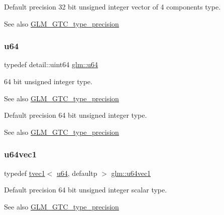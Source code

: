 Default precision 32 bit unsigned integer vector of 4 components type. \begin{DoxySeeAlso}{See also}
\hyperlink{group__gtc__type__precision}{G\+L\+M\+\_\+\+G\+T\+C\+\_\+type\+\_\+precision} 
\end{DoxySeeAlso}
\mbox{\label{group__gtc__type__precision_ga71cedd4972f9cb1a5e14dfe5ab83ecd7}} 
\subsubsection{\texorpdfstring{u64}{u64}}
{\footnotesize\ttfamily typedef detail\+::uint64 \hyperlink{group__gtc__type__precision_ga71cedd4972f9cb1a5e14dfe5ab83ecd7}{glm\+::u64}}

64 bit unsigned integer type. \begin{DoxySeeAlso}{See also}
\hyperlink{group__gtc__type__precision}{G\+L\+M\+\_\+\+G\+T\+C\+\_\+type\+\_\+precision}
\end{DoxySeeAlso}
Default precision 64 bit unsigned integer type. \begin{DoxySeeAlso}{See also}
\hyperlink{group__gtc__type__precision}{G\+L\+M\+\_\+\+G\+T\+C\+\_\+type\+\_\+precision} 
\end{DoxySeeAlso}
\mbox{\label{group__gtc__type__precision_gaf0a59fdb715cf4ddf0c4dabf0e2286a9}} 
\subsubsection{\texorpdfstring{u64vec1}{u64vec1}}
{\footnotesize\ttfamily typedef \hyperlink{structglm_1_1tvec1}{tvec1}$<$ \hyperlink{group__gtc__type__precision_ga71cedd4972f9cb1a5e14dfe5ab83ecd7}{u64}, defaultp $>$ \hyperlink{group__gtc__type__precision_gaf0a59fdb715cf4ddf0c4dabf0e2286a9}{glm\+::u64vec1}}

Default precision 64 bit unsigned integer scalar type. \begin{DoxySeeAlso}{See also}
\hyperlink{group__gtc__type__precision}{G\+L\+M\+\_\+\+G\+T\+C\+\_\+type\+\_\+precision} 
\end{DoxySeeAlso}
\mbox{\label{group__gtc__type__precision_gaddd85665767e5d32aee8516f00c45f59}} 
